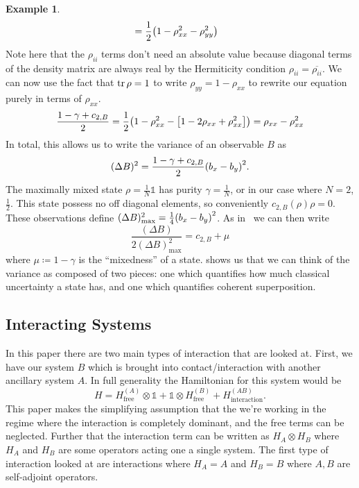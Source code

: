 \documentclass[11pt,english]{article}
\theoremstyle{definition}
\newtheorem{example}{Example}[section]
\newcommand{\twonorm}[1][\rho]{c_{2,B} (#1)}
\newcommand{\twonormE}[1][\rho]{c_{2,B}}
\begin{document}
\begin{example}
\begin{align*}
		                                 & = \frac{1}{2}\qty(1 - \rho_{xx}^2 - \rho_{yy}^2)
	\end{align*}
	Note here that the $\rho_{ii}$ terms don't need an absolute value because diagonal terms of the density matrix are always real by the Hermiticity condition $\rho_{ii} = \overline{\rho_{ii}}$.
	We can now use the fact that $\tr\rho = 1$ to write $\rho_{yy} = 1 - \rho_{xx}$ to rewrite our equation purely in terms of $\rho_{xx}$.
	\begin{equation*}
		\frac{1 - \gamma + \twonormE}{2} =\frac{1}{2}\qty(1 - \rho_{xx}^2 - \qty[1 - 2\rho_{xx} + \rho_{xx}^2]) = \rho_{xx} - \rho_{xx}^2
	\end{equation*}
	In total, this allows us to write the variance of an observable $B$ as
	\begin{equation*}
		(\Delta B)^2 = \frac{1 - \gamma + \twonormE}{2}\qty(b_x - b_y)^2.
	\end{equation*}
	The maximally mixed state $\rho = \frac{1}{N}\mathbb{1}$ has purity $\gamma = \frac{1}{N}$, or in our case where $N = 2$, $\frac{1}{2}$. This state possess no off diagonal elements, so conveniently $\twonorm{\rho} = 0$. These observations define $(\Delta B)_\text{max}^2 = \frac{1}{4}\qty(b_x - b_y)^2$. As in~\cite{dynamic-entropies} we can then write
	\begin{equation}\label{eq:variance-max}
		\frac{(\Delta B)}{2(\Delta B)_\text{max}^2} = \twonormE + \mu
	\end{equation}
	where $\mu\coloneqq 1 - \gamma$ is the ``mixedness'' of a state.  shows us that we can think of the variance as composed of two pieces: one which quantifies how much classical uncertainty a state has, and one which quantifies coherent superposition.
\end{example}

\subsection{Interacting Systems}
In this paper there are two main types of interaction that are looked at. First, we have our system $B$ which is brought into contact/interaction with another ancillary system $A$. In full generality the Hamiltonian for this system would be
\begin{equation*}
	H = H^{(A)}_\text{free}\otimes\mathbb{1} + \mathbb{1}\otimes H^{(B)}_\text{free} + H^{(AB)}_\text{interaction}.
\end{equation*}
This paper makes the simplifying assumption that the we're working in the regime where the interaction is completely dominant, and the free terms can be neglected. Further that the interaction term can be written as $H_A\otimes H_B$ where $H_A$ and $H_B$ are some operators acting one a single system. The first type of interaction looked at are interactions where $H_A = A$ and $H_B = B$ where $A, B$ are self-adjoint operators.
\end{document}

